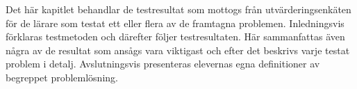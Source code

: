 \textcolor{Mahogany}{Det här kapitlet behandlar de testresultat som mottogs från utvärderingsenkäten för de lärare som testat ett eller flera av de framtagna problemen. Inledningsvis förklaras testmetoden och därefter följer testresultaten. Här sammanfattas även några av de resultat som ansågs vara viktigast och efter det beskrivs varje testat problem i detalj. Avslutningsvis presenteras elevernas egna definitioner av begreppet problemlösning.}